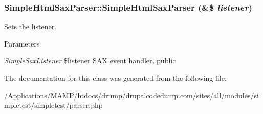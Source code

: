 \hypertarget{class_simple_html_sax_parser_a1370090e97f034ef38839a4569d740d8}{
\subsubsection[{SimpleHtmlSaxParser}]{\setlength{\rightskip}{0pt plus 5cm}SimpleHtmlSaxParser::SimpleHtmlSaxParser (\&\$ {\em listener})}}
\label{class_simple_html_sax_parser_a1370090e97f034ef38839a4569d740d8}
Sets the listener. 
\begin{DoxyParams}{Parameters}
\item[{\em \hyperlink{class_simple_sax_listener}{SimpleSaxListener}}]\$listener SAX event handler.  public \end{DoxyParams}


The documentation for this class was generated from the following file:\begin{DoxyCompactItemize}
\item 
/Applications/MAMP/htdocs/drump/drupalcodedump.com/sites/all/modules/simpletest/simpletest/parser.php\end{DoxyCompactItemize}
